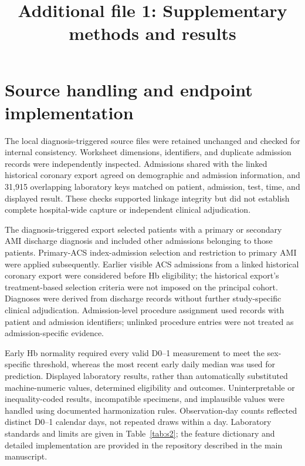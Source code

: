 \documentclass[pdflatex,sn-vancouver-num]{sn-jnl}
\begin{document}
\title[Supplementary information]{Additional file 1: Supplementary methods and results}
\author[1]{ }
\maketitle
\section{Source handling and endpoint implementation}

The local diagnosis-triggered source files were retained unchanged and checked for internal consistency. Worksheet dimensions, identifiers, and duplicate admission records were independently inspected. Admissions shared with the linked historical coronary export agreed on demographic and admission information, and 31,915 overlapping laboratory keys matched on patient, admission, test, time, and displayed result. These checks supported linkage integrity but did not establish complete hospital-wide capture or independent clinical adjudication.

The diagnosis-triggered export selected patients with a primary or secondary AMI discharge diagnosis and included other admissions belonging to those patients. Primary-ACS index-admission selection and restriction to primary AMI were applied subsequently. Earlier visible ACS admissions from a linked historical coronary export were considered before Hb eligibility; the historical export's treatment-based selection criteria were not imposed on the principal cohort. Diagnoses were derived from discharge records without further study-specific clinical adjudication. Admission-level procedure assignment used records with patient and admission identifiers; unlinked procedure entries were not treated as admission-specific evidence.

Early Hb normality required every valid D0--1 measurement to meet the sex-specific threshold, whereas the most recent early daily median was used for prediction. Displayed laboratory results, rather than automatically substituted machine-numeric values, determined eligibility and outcomes. Uninterpretable or inequality-coded results, incompatible specimens, and implausible values were handled using documented harmonization rules. Observation-day counts reflected distinct D0--1 calendar days, not repeated draws within a day. Laboratory standards and limits are given in Table~\ref{tab:s2}; the feature dictionary and detailed implementation are provided in the repository described in the main manuscript.
\end{document}
